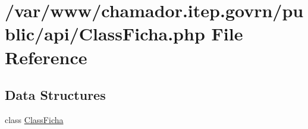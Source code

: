 \hypertarget{_class_ficha_8php}{}\section{/var/www/chamador.itep.\+govrn/public/api/\+Class\+Ficha.php File Reference}
\label{_class_ficha_8php}
\subsection*{Data Structures}
\begin{DoxyCompactItemize}
\item 
class \hyperlink{class_class_ficha}{Class\+Ficha}
\end{DoxyCompactItemize}
